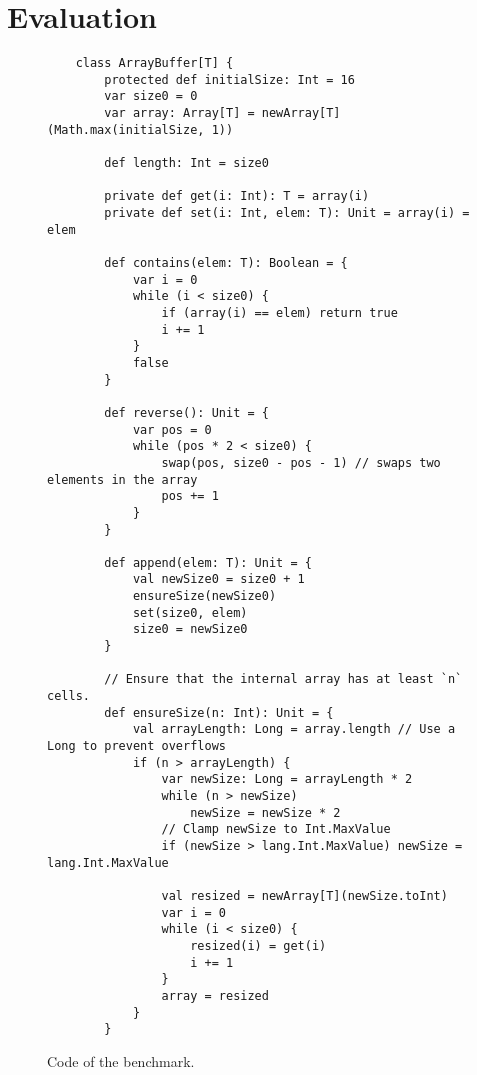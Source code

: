\chapter{Evaluation}

\begin{figure}[!htb]
	\begin{verbatim}
	class ArrayBuffer[T] {
		protected def initialSize: Int = 16
		var size0 = 0
		var array: Array[T] = newArray[T](Math.max(initialSize, 1))
		
		def length: Int = size0
		
		private def get(i: Int): T = array(i)
		private def set(i: Int, elem: T): Unit = array(i) = elem
		
		def contains(elem: T): Boolean = {
			var i = 0
			while (i < size0) {
				if (array(i) == elem) return true
				i += 1
			}
			false
		}
		
		def reverse(): Unit = {
			var pos = 0
			while (pos * 2 < size0) {
				swap(pos, size0 - pos - 1) // swaps two elements in the array
				pos += 1
			}
		}
		
		def append(elem: T): Unit = {
			val newSize0 = size0 + 1
			ensureSize(newSize0)
			set(size0, elem)
			size0 = newSize0
		}
		
		// Ensure that the internal array has at least `n` cells. 
		def ensureSize(n: Int): Unit = {
			val arrayLength: Long = array.length // Use a Long to prevent overflows
			if (n > arrayLength) {
				var newSize: Long = arrayLength * 2
				while (n > newSize)
					newSize = newSize * 2
				// Clamp newSize to Int.MaxValue
				if (newSize > lang.Int.MaxValue) newSize = lang.Int.MaxValue
				
				val resized = newArray[T](newSize.toInt)
				var i = 0
				while (i < size0) {
					resized(i) = get(i)
					i += 1
				}
				array = resized
			}
		}
	\end{verbatim}
	\caption{Code of the  benchmark.}
	\label{example:arraybuffer-benchmark}
\end{figure}
